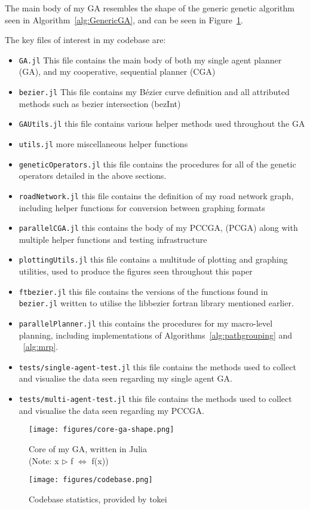 The main body of my GA resembles the shape of the generic genetic algorithm seen in Algorithm~\ref{alg:GenericGA}, and can be seen in Figure~\ref{fig:core-ga}.

The key files of interest in my codebase are:

\begin{itemize}
  \item \texttt{GA.jl} This file contains the main body of both my single agent planner (GA), and my cooperative, sequential planner (CGA)
  \item \texttt{bezier.jl} This file contains my Bézier curve definition and all attributed methods such as bezier intersection (bezInt)
  \item \texttt{GAUtils.jl} this file contains various helper methods used throughout the GA
  \item \texttt{utils.jl}  more miscellaneous helper functions
  \item \texttt{geneticOperators.jl} this file contains the procedures for all of the genetic operators detailed in the above sections.
  \item \texttt{roadNetwork.jl} this file contains the definition of my road network graph, including helper functions for conversion between graphing formats
  \item \texttt{parallelCGA.jl} this contains the body of my PCCGA, (PCGA) along with multiple helper functions and testing infrastructure
  \item \texttt{plottingUtils.jl} this file contains a multitude of plotting and graphing utilities, used to produce the figures seen throughout this paper
  \item \texttt{ftbezier.jl} this file contains the versions of the functions found in \texttt{bezier.jl} written to utilise the libbezier fortran library mentioned earlier.
  \item \texttt{parallelPlanner.jl} this contains the procedures for my macro-level planning, including implementations of Algorithms~\ref{alg:pathgrouping} and ~\ref{alg:mrp}.
  \item \texttt{tests/single-agent-test.jl} this file contains the methods used to collect and visualise the data seen regarding my single agent GA.
  \item \texttt{tests/multi-agent-test.jl} this file contains the methods used to collect and visualise the data seen regarding my PCCGA.
\end{itemize}


\begin{figure}[ht]
  \centering
  \texttt{[image: figures/core-ga-shape.png]}
  \caption{\label{fig:core-ga} Core of my GA, written in Julia \\ \small (Note: x $\rhd$ f $\Leftrightarrow$ f(x))}
\end{figure}



\begin{figure}[ht]
  \centering
  \texttt{[image: figures/codebase.png]}
  \caption{\label{fig:codebase} Codebase statistics, provided by tokei}
\end{figure}



